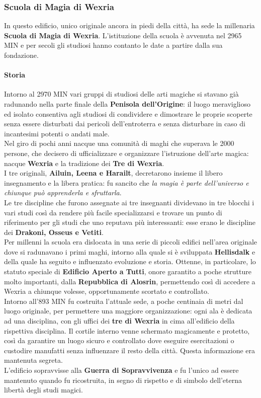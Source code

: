 \documentclass[10pt,twoside,onecolumn,openany]{book}
\begin{document}
\subsubsection{Scuola di Magia di Wexria}
In questo edificio, unico originale ancora in piedi della città, ha sede la millenaria \textbf{Scuola di Magia di Wexria}. L'istituzione della scuola è avvenuta nel 2965 MIN e per secoli gli studiosi hanno contanto le date a partire dalla sua fondazione.
\paragraph{Storia}
Intorno al 2970 MIN vari gruppi di studiosi delle arti magiche si stavano già radunando nella parte finale della \textbf{Penisola dell'Origine}: il luogo meraviglioso ed isolato consentiva agli studiosi di condividere e dimostrare le proprie scoperte senza essere disturbati dai pericoli dell'entroterra e senza disturbare in caso di incantesimi potenti o andati male.\\
Nel giro di pochi anni nacque una comunità di maghi che superava le 2000 persone, che decisero di ufficializzare e organizzare l'istruzione dell'arte magica: nacque \textbf{Wexria} e la tradizione dei \textbf{Tre di Wexria}.\\
I tre originali, \textbf{Ailuin, Leena e Harailt}, decretarono insieme il libero insegnamento e la libera pratica: fu sancito che \textit{la magia è parte dell'universo e chiunque può apprenderla e sfruttarla}.\\
Le tre discipline che furono assegnate ai tre insegnanti dividevano in tre blocchi i vari studi così da rendere più facile specializzarsi e trovare un punto di riferimento per gli studi che uno reputava più interessanti: esse erano le discipline dei \textbf{Drakoni, Osseus e Vetiti}.\\
Per millenni la scuola era dislocata in una serie di piccoli edifici nell'area originale dove si radunavano i primi maghi, intorno alla quale si è sviluppata \textbf{Hellisdalk} e della quale ha seguito e influenzato evoluzione e storia. Ottenne, in particolare, lo statuto speciale di \textbf{Edificio Aperto a Tutti}, onore garantito a poche strutture molto importanti, dalla \textbf{Repubblica di Alosrin}, permettendo così di accedere a Wexria a chiunque volesse, opportunamente scortato e controllato.\\
Intorno all'893 MIN fu costruita l'attuale sede, a poche centinaia di metri dal luogo originale, per permettere una maggiore organizzazione: ogni ala è dedicata ad una disciplina, con gli uffici dei \textbf{tre di Wexria} in cima all'edificio della rispettiva disciplina. Il cortile interno venne schermato magicamente e protetto, così da garantire un luogo sicuro e controllato dove eseguire esercitazioni o custodire manufatti senza influenzare il resto della città. Questa informazione era mantenuta segreta.\\
L'edificio sopravvisse alla \textbf{Guerra di Sopravvivenza} e fu l'unico ad essere mantenuto quando fu ricostruita, in segno di rispetto e di simbolo dell'eterna libertà degli studi magici.
\newpage
\end{document}

